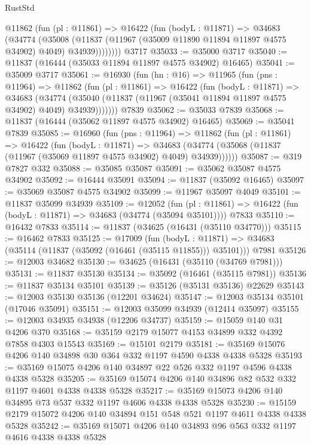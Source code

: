 \begin{lexlean}{RustStd}
\begin{coremodule}
{\begin{coremodule}
{{{{{{{{{{{{{{{{{{{{{{{{{{{{{{{{{{{{{{{{{{{{{{{{{{        @11862
          (fun (pl : @11861) =>
          @16422
            (fun (bodyL : @11871) =>
            @34683
              (@34774
                (@35008
                  (@11837 (@11967 (@35009 @11890 @11894 @11897 @4575 @34902) @4049) @34939))))))))
    @3717
@35033 := @35000 @3717
@35040 := @11837 (@16444 (@35033 @11894 @11897 @4575 @34902) @16465)
@35041 := @35009 @3717
@35061 := @16930
    (fun (hn : @16) =>
    @11965
      (fun (pns : @11964) =>
      @11862
        (fun (pl : @11861) =>
        @16422
          (fun (bodyL : @11871) =>
          @34683
            (@34774 (@35040 (@11837 (@11967 (@35041 @11894 @11897 @4575 @34902) @4049) @34939)))))))
    @7839
@35062 := @35033 @7839
@35068 := @11837 (@16444 (@35062 @11897 @4575 @34902) @16465)
@35069 := @35041 @7839
@35085 := @16960
    (fun (pns : @11964) =>
    @11862
      (fun (pl : @11861) =>
      @16422
        (fun (bodyL : @11871) =>
        @34683 (@34774 (@35068 (@11837 (@11967 (@35069 @11897 @4575 @34902) @4049) @34939))))))
@35087 := @319 @7827 @332
@35088 := @35085 @35087
@35091 := @35062 @35087 @4575 @34902
@35092 := @16444 @35091
@35094 := @11837 (@35092 @16465)
@35097 := @35069 @35087 @4575 @34902
@35099 := @11967 @35097 @4049
@35101 := @11837 @35099 @34939
@35109 := @12052
    (fun (pl : @11861) => @16422 (fun (bodyL : @11871) => @34683 (@34774 (@35094 @35101))))
    @7833
@35110 := @16432 @7833
@35114 := @11837 (@34625 (@16431 (@35110 @34770)))
@35115 := @16462 @7833
@35125 := @17009
    (fun (bodyL : @11871) => @34683 (@35114 (@11837 (@35092 (@16461 (@35115 @11855))) @35101)))
    @7981
@35126 := @12003 @34682
@35130 := @34625 (@16431 (@35110 (@34769 @7981)))
@35131 := @11837 @35130
@35134 := @35092 (@16461 (@35115 @7981))
@35136 := @11837 @35134 @35101
@35139 := @35126 (@35131 @35136) @22629
@35143 := @12003 @35130 @35136 (@12201 @34624)
@35147 := @12003 @35134 @35101 (@17046 @35091)
@35151 := @12003 @35099 @34939 (@12414 @35097)
@35155 := @12003 @34935 @34938 (@12206 @34737)
@35159 := @15059 @140 @31 @4206 @370
@35168 := @35159 @2179 @15077 @4153 @34899 @332 @4392 @7858 @4303 @15543
@35169 := @15101 @2179
@35181 := @35169 @15076 @4206 @140 @34898 @30 @364 @332 @1197 @4590 @4338 @4338 @5328
@35193 := @35169 @15075 @4206 @140 @34897 @22 @526 @332 @1197 @4596 @4338 @4338 @5328
@35205 := @35169 @15074 @4206 @140 @34896 @82 @532 @332 @1197 @4601 @4338 @4338 @5328
@35217 := @35169 @15073 @4206 @140 @34895 @73 @537 @332 @1197 @4606 @4338 @4338 @5328
@35230 := @15159 @2179 @15072 @4206 @140 @34894 @151 @548 @521 @1197 @4611 @4338 @4338 @5328
@35242 := @35169 @15071 @4206 @140 @34893 @96 @563 @332 @1197 @4616 @4338 @4338 @5328
}}}}}}}}}}}}}}}}}}}}}}}}}}}}}}}}}}}}}}}}}}}}}}}}}}
\end{coremodule}}
\end{coremodule}
\end{lexlean}
